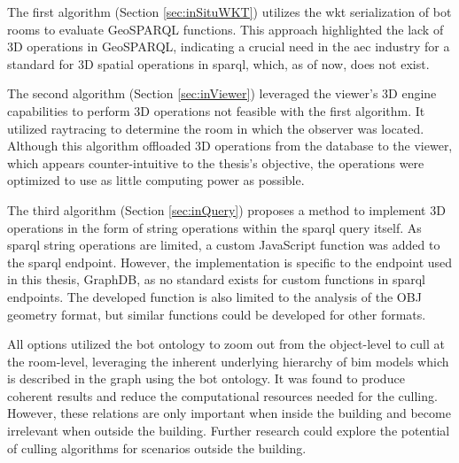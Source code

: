 The first algorithm (Section \ref{sec:inSituWKT}) utilizes the \ac{wkt} serialization of \ac{bot} rooms to evaluate GeoSPARQL functions. This approach highlighted the lack of 3D operations in GeoSPARQL, indicating a crucial need in the \ac{aec} industry for a standard for 3D spatial operations in \ac{sparql}, which, as of now, does not exist.

The second algorithm (Section \ref{sec:inViewer}) leveraged the viewer's 3D engine capabilities to perform 3D operations not feasible with the first algorithm. It utilized raytracing to determine the room in which the observer was located. Although this algorithm offloaded 3D operations from the database to the viewer, which appears counter-intuitive to the thesis's objective, the operations were optimized to use as little computing power as possible.

The third algorithm (Section \ref{sec:inQuery}) proposes a method to implement 3D operations in the form of string operations within the \ac{sparql} query itself. As \ac{sparql} string operations are limited, a custom JavaScript function was added to the \ac{sparql} endpoint. However, the implementation is specific to the endpoint used in this thesis, GraphDB, as no standard exists for custom functions in \ac{sparql} endpoints. The developed function is also limited to the analysis of the OBJ geometry format, but similar functions could be developed for other formats.

All options utilized the \ac{bot} ontology to zoom out from the object-level to cull at the room-level, leveraging the inherent underlying hierarchy of \ac{bim} models which is described in the graph using the \ac{bot} ontology. It was found to produce coherent results and reduce the computational resources needed for the culling. However, these relations are only important when inside the building and become irrelevant when outside the building. Further research could explore the potential of culling algorithms for scenarios outside the building.